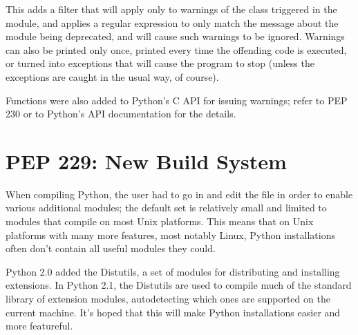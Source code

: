 \documentclass{howto}
\begin{document}
This adds a filter that will apply only to warnings of the class
 triggered in the  module, and applies a regular expression to only match the message about the  module being deprecated, and will cause such warnings to be ignored.  Warnings can also be printed only once, printed every time the offending code is executed, or turned into exceptions that will cause the program to stop (unless the exceptions are caught in the usual way, of course). 

Functions were also added to Python's C API for issuing warnings;
refer to PEP 230 or to Python's API documentation for the details.

\begin{seealso}

\end{seealso}
    
\section{PEP 229: New Build System}

When compiling Python, the user had to go in and edit the
 file in order to enable various additional
modules; the default set is relatively small and limited to modules
that compile on most Unix platforms.  This means that on Unix
platforms with many more features, most notably Linux, Python
installations often don't contain all useful modules they could.

Python 2.0 added the Distutils, a set of modules for distributing and
installing extensions.  In Python 2.1, the Distutils are used to
compile much of the standard library of extension modules,
autodetecting which ones are supported on the current machine.  
It's hoped that this will make Python installations easier and more featureful.

\begin{seealso}
\end{seealso}
\end{document}
